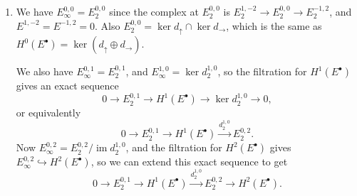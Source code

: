\documentclass{report}
\DeclareMathOperator{\im}{im}
\begin{document}
\begin{enumerate}[label=\textbf{1.7.\Alph*.}]
	\item We have $E^{0,0}_\infty=E^{0,0}_2$ since the complex at $E^{0,0}_2$ is
	      $E^{1,-2}_2\to E^{0,0}_2\to E^{-1,2}_2$, and $E^{1,-2}=E^{-1,2}=0$. Also
	      $E^{0,0}_2=\ker d_\uparrow\cap\ker d_\rightarrow$, which is the same as
	      $H^0(E^\bullet)=\ker(d_\uparrow\oplus d_\rightarrow)$.

	      We also have $E^{0,1}_\infty=E^{0,1}_2$, and
	      $E^{1,0}_\infty=\ker d^{1,0}_2$, so the filtration for $H^1(E^\bullet)$
	      gives an exact sequence
	      \begin{equation*}
		      0\to E^{0,1}_2\to H^1(E^\bullet)\to\ker d^{1,0}_2\to0,
	      \end{equation*}
	      or equivalently
	      \begin{equation*}
		      0\to E^{0,1}_2\to H^1(E^\bullet)\xrightarrow{d^{1,0}_2}E^{0,2}_2.
	      \end{equation*}
	      Now $E^{0,2}_\infty=E^{0,2}_2/\im d^{1,0}_2$, and the filtration for
	      $H^2(E^\bullet)$ gives $E^{0,2}_\infty\hookrightarrow H^2(E^\bullet)$,
	      so we can extend this exact sequence to get
	      \begin{equation*}
		      0\to E^{0,1}_2\to H^1(E^\bullet)\xrightarrow{d^{1,0}_2}E^{0,2}_2
		      \to H^2(E^\bullet).
	      \end{equation*}


\end{enumerate}
\end{document}
